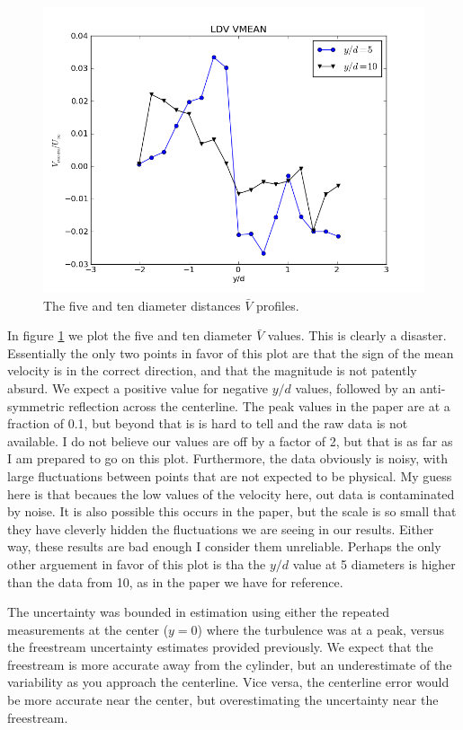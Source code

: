 \documentclass{article}
\begin{document}
\begin{figure}[!htb]
 \begin{center}
  \includegraphics[width = 12 cm]{figs/vmean}
  \caption{The five and ten diameter distances $\bar V$ profiles. }
  \label{vmean}
 \end{center}
\end{figure}

In figure \ref{vmean} we plot the five and ten diameter $\bar V$ values. This is clearly a disaster. 
Essentially the only two points in favor of this plot are that the sign of the mean velocity is in the 
correct direction, and that the magnitude is not patently absurd. We expect a positive value for 
negative $y/d$ values, followed by an anti-symmetric reflection across the centerline. The peak values in the paper
are at a fraction of 0.1, but beyond that is is hard to tell and the raw data is not available. I do not 
believe our values are off by a factor of 2, but that is as far as I am prepared to go on this plot. Furthermore, the data
obviously is noisy, with large fluctuations between points that are not expected to be physical. My guess here is that
becaues the low values of the velocity here, out data is contaminated by noise. It is also possible this occurs in the 
paper, but the scale is so small that they have cleverly hidden the fluctuations we are seeing in our results. Either way, 
these results are bad enough I consider them unreliable. Perhaps the only other arguement in favor of this plot is tha
the $y/d$ value at 5 diameters is higher than the data from 10, as in the paper we have for reference. 


The uncertainty was bounded in estimation using either the repeated
measurements at the center ($y=0$) where the turbulence was at a peak,
versus the freestream uncertainty estimates provided previously. We
expect that the freestream is more accurate away from the cylinder, but
an underestimate of the variability as you approach the centerline. Vice
versa, the centerline error would be more accurate near the center, but
overestimating the uncertainty near the freestream. 
\end{document}
